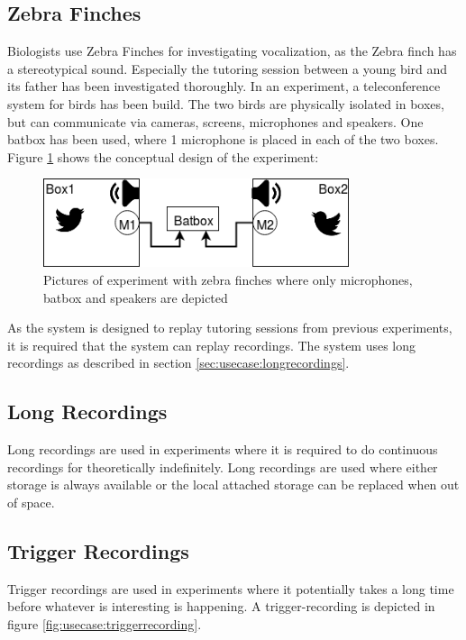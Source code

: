 


\subsection{Zebra Finches}
Biologists use Zebra Finches for investigating vocalization, as the Zebra finch has a stereotypical sound. Especially the tutoring session between a young bird and its father has been investigated thoroughly. In an experiment, a teleconference system for birds has been build. The two birds are physically isolated in boxes,
but can communicate via cameras, screens, microphones and speakers. One batbox has been used, where 1 microphone is placed in each of the two boxes.\citep{larsen2016system}
Figure \ref{fig:usecases:zebra:overview} shows the conceptual design of the experiment:

\begin{figure}[h!]
	\centering
	\includegraphics[width=0.8\textwidth]{figures/zebrafinches_experiment1.png}
	\caption{Pictures of experiment with zebra finches where only microphones, batbox and speakers are depicted}\label{fig:usecases:zebra:overview}
\end{figure}

As the system is designed to replay tutoring sessions from previous experiments, it is required that the system can replay recordings.
The system uses long recordings as described in section \ref{sec:usecase:longrecordings}.

\subsection{Long Recordings}
Long recordings are used in experiments where it is required to do continuous recordings for theoretically indefinitely. Long recordings are used where either storage is always available or the local attached storage can be replaced when out of space.

\subsection{Trigger Recordings}
Trigger recordings are used in experiments where it potentially takes a long time before whatever is interesting is happening. A trigger-recording is depicted in figure \ref{fig:usecase:triggerrecording}.

